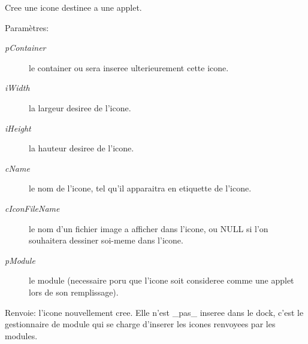 Cree une icone destinee a une applet. \begin{Desc}
\item[Paramètres:]
\begin{description}
\item[{\em pContainer}]le container ou sera inseree ulterieurement cette icone. \item[{\em iWidth}]la largeur desiree de l'icone. \item[{\em iHeight}]la hauteur desiree de l'icone. \item[{\em cName}]le nom de l'icone, tel qu'il apparaitra en etiquette de l'icone. \item[{\em cIconFileName}]le nom d'un fichier image a afficher dans l'icone, ou NULL si l'on souhaitera dessiner soi-meme dans l'icone. \item[{\em pModule}]le module (necessaire poru que l'icone soit consideree comme une applet lors de son remplissage). \end{description}
\end{Desc}
\begin{Desc}
\item[Renvoie:]l'icone nouvellement cree. Elle n'est \_\-pas\_\- inseree dans le dock, c'est le gestionnaire de module qui se charge d'inserer les icones renvoyees par les modules. \end{Desc}
